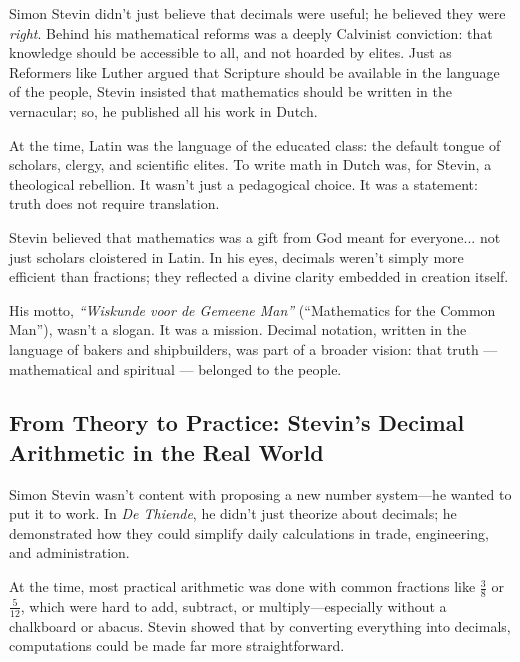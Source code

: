 \begin{tcolorbox}[colback=gray!5!white, colframe=black!80!white, title={Historical Sidenote: Stevin’s Theology of Decimal Math}, fonttitle=\bfseries, arc=1.5mm, boxrule=0.4pt]

    Simon Stevin didn’t just believe that decimals were useful; he believed they were \textit{right}. Behind his mathematical reforms was a deeply Calvinist conviction: that knowledge should be accessible to all, and not hoarded by elites. Just as Reformers like Luther argued that Scripture should be available in the language of the people, Stevin insisted that mathematics should be written in the vernacular; so, he published all his work in Dutch.

    \medskip

    At the time, Latin was the language of the educated class: the default tongue of scholars, clergy, and scientific elites. To write math in Dutch was, for Stevin, a theological rebellion. It wasn’t just a pedagogical choice. It was a statement: truth does not require translation.

    \medskip
    
    Stevin believed that mathematics was a gift from God meant for everyone... not just scholars cloistered in Latin. In his eyes, decimals weren’t simply more efficient than fractions; they reflected a divine clarity embedded in creation itself.

    \medskip
    
    His motto, \textit{“Wiskunde voor de Gemeene Man”} (“Mathematics for the Common Man”), wasn’t a slogan. It was a mission. Decimal notation, written in the language of bakers and shipbuilders, was part of a broader vision: that truth --- mathematical and spiritual --- belonged to the people.

\end{tcolorbox}

\subsection{From Theory to Practice: Stevin’s Decimal Arithmetic in the Real World}

Simon Stevin wasn’t content with proposing a new number system—he wanted to put it to work. In \textit{De Thiende}, he didn’t just theorize about decimals; he demonstrated how they could simplify daily calculations in trade, engineering, and administration.

At the time, most practical arithmetic was done with common fractions like \( \frac{3}{8} \) or \( \frac{5}{12} \), which were hard to add, subtract, or multiply—especially without a chalkboard or abacus. Stevin showed that by converting everything into decimals, computations could be made far more straightforward.

